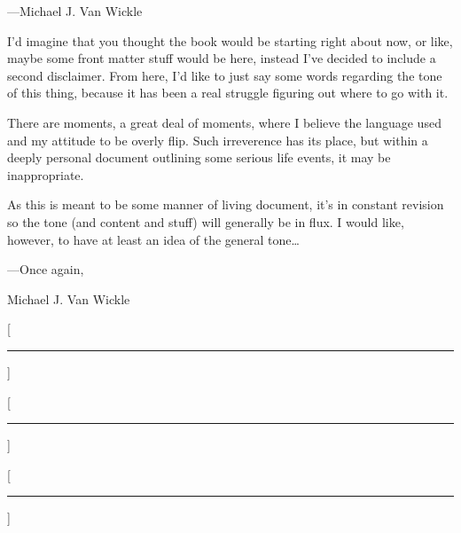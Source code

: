 \noindent\hspace*{2em} ---Michael J. Van Wickle
\vspace*{\fill}
\newpage

\setcounter{footnote}{0}
{\normalsize I'd imagine that you thought the book would be starting right about now, or like, maybe some front matter stuff would be here, instead I've decided to include a second disclaimer.
From here, I'd like to just say some words regarding the tone of this thing, because it has been a real struggle figuring out where to go with it.

There are moments, a great deal of moments, where I believe the language used and my attitude to be overly flip.
Such irreverence has its place, but within a deeply personal document outlining some serious life events, it may be inappropriate.

As this is meant to be some manner of living document, it's in constant revision so the tone (and content and stuff) will generally be in flux.
I would like, however, to have at least an idea of the general tone\ldots}

\noindent\hspace*{2em} ---Once again,

\noindent\hspace*{2em} Michael J. Van Wickle
\vspace*{\fill}

\setlength{\parskip}{0.2em}

\newpage

\newlength{\headersep}
\setlength{\headersep}{2em}
\newcommand{\headerdelim}{}
\titleformat{\chapter}[frame]{\Large}{\filright\enspace{\Large \chaptertitlename~\thechapter}\enspace}{2cm}{\LARGE\bfseries\filcenter}
\titleformat{\section}[block]{\filcenter\Large}{\thesection\headerdelim}{\headersep}{\bfseries}[\rule{\titlewidth}{0.8pt}]
\titleformat{\subsection}[block]{\filcenter\large}{\thesubsection}{\headersep}{\bfseries}[\rule{\titlewidth}{0.5pt}]
\titleformat{\subsubsection}[block]{\filcenter\small}{\thesubsubsection}{\headersep}{\bfseries}[\rule{\titlewidth}{0.3pt}]


